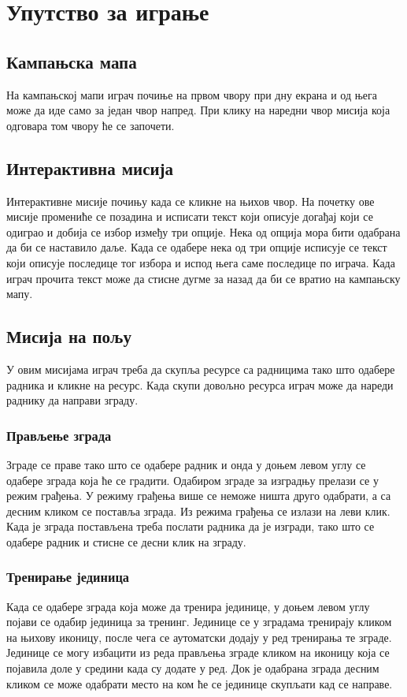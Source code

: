 \documentclass[11pt,a4paper]{article}
\begin{document}
\section{Упутство за играње}

\subsection{Кампањска мапа}
На кампањској мапи играч почиње на првом чвору при дну екрана и од њега може да иде само за један чвор напред. При клику на наредни чвор мисија која одговара том чвору ће се започети.

\subsection{Интерактивна мисија}
Интерактивне мисије почињу када се кликне на њихов чвор. На почетку ове мисије промениће се позадина и исписати текст који описује догађај који се одиграо и добија се избор између три опције. Нека од опција мора бити одабрана да би се  наставило даље. Када се одабере нека од три опције исписује се текст који описује последице тог избора и испод њега саме последице по играча. Када играч прочита текст може да стисне дугме за назад да би се вратио на кампањску мапу.

\subsection{Мисија на пољу}
У овим мисијама играч треба да скупља ресурсе са радницима тако што одабере радника и кликне на ресурс. Када скупи довољно ресурса играч може да нареди раднику да направи зграду. 

\subsubsection{Прављење зграда}
Зграде се праве тако што се одабере радник и онда у доњем левом углу се одабере зграда која ће се градити. Одабиром зграде за изградњу прелази се у режим грађења. У режиму грађења више се неможе ништа друго одабрати, а са десним кликом се поставља зграда. Из режима грађења се излази на леви клик. Када је зграда постављена треба послати радника да је изгради, тако што се одабере радник и стисне се десни клик на зграду. 

\subsubsection{Тренирање јединица}
Када се одабере зграда која може да тренира јединице, у доњем левом углу појави се одабир јединица за тренинг. Јединице се у зградама тренирају кликом на њихову иконицу, после чега се аутоматски додају у ред тренирања те зграде. Јединице се могу избацити из реда прављења зграде кликом на иконицу која се појавила доле у средини када су додате у ред. Док је одабрана зграда десним кликом се може одабрати место на ком ће се јединице скупљати кад се направе. 
\end{document}

